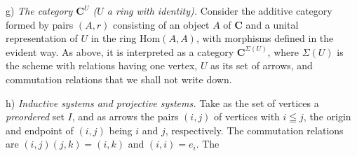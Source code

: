 g) \textit{The category $\mathbf{C}^U$ ($U$ a ring with identity).} Consider
the additive category formed by pairs $(A,r)$ consisting of an object $A$ of
$\mathbf{C}$ and a unital representation of $U$ in the ring $\mathrm{Hom}(A,A)$, with
morphisms defined in the evident way. As above, it is interpreted as a
category $\mathbf{C}^{\Sigma(U)}$, where $\Sigma(U)$ is the scheme with relations
having one vertex, $U$ as its set of arrows, and commutation relations that we
shall not write down.

h) \textit{Inductive systems and projective systems.} Take as the
set of vertices a \textit{preordered} set $I$, and as arrows the pairs $(i,j)$
of vertices with $i\leqq j$, the origin and endpoint of $(i,j)$ being $i$ and
$j$, respectively. The commutation relations are
$(i,j)(j,k)=(i,k)$ and $(i,i)=e_i$. The

